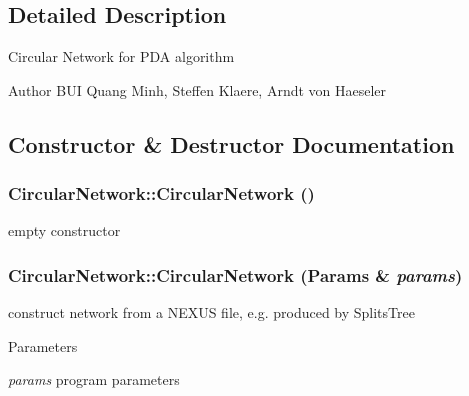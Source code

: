 \subsection{Detailed Description}
Circular Network for PDA algorithm

\begin{DoxyAuthor}{Author}
BUI Quang Minh, Steffen Klaere, Arndt von Haeseler 
\end{DoxyAuthor}


\subsection{Constructor \& Destructor Documentation}
\hypertarget{classCircularNetwork_acc7bc17d879498a780501e2a0bdaec03}{
\subsubsection[{CircularNetwork}]{\setlength{\rightskip}{0pt plus 5cm}CircularNetwork::CircularNetwork ()}}
\label{classCircularNetwork_acc7bc17d879498a780501e2a0bdaec03}
empty constructor \hypertarget{classCircularNetwork_acdd16c31a1ef6cdcbfeaf60d71e8b47e}{
\subsubsection[{CircularNetwork}]{\setlength{\rightskip}{0pt plus 5cm}CircularNetwork::CircularNetwork ({\bf Params} \& {\em params})}}
\label{classCircularNetwork_acdd16c31a1ef6cdcbfeaf60d71e8b47e}
construct network from a NEXUS file, e.g. produced by SplitsTree 
\begin{DoxyParams}{Parameters}
\item[{\em params}]program parameters \end{DoxyParams}


